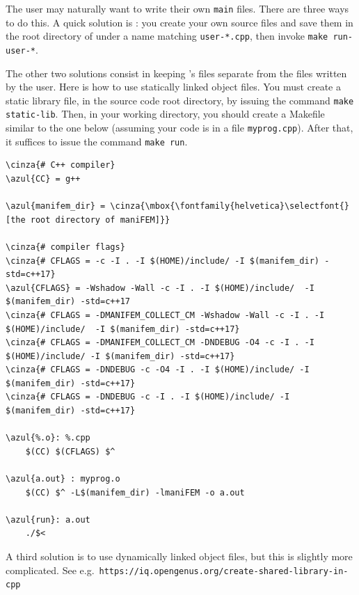 The user may naturally want to write their own {\small\tt main} files.
There are three ways to do this.
A quick solution is : you create your own source files and save them in the root directory
of {\maniFEM} under a name matching {\small\tt user-*.cpp}, then invoke {\small\tt make run-user-*}.

The other two solutions consist in keeping \maniFEM's files separate from the files written
by the user.
Here is how to use statically linked object files.
You must create a static library file, in the {\maniFEM} source code root directory,
by issuing the command {\small\tt make static-lib}.
Then, in your working directory, you should create a Makefile similar to the one below
(assuming your code is in a file {\small\tt myprog.cpp}).
After that, it suffices to issue the command {\small\tt make run}.

\begin{Verbatim}[commandchars=\\\{\},formatcom=\small\tt,frame=single,
   label=Makefile,rulecolor=\color{coment},
   baselinestretch=0.94,framesep=2mm                                            ]
\cinza{# C++ compiler}
\azul{CC} = g++

\azul{manifem_dir} = \cinza{\mbox{\fontfamily{helvetica}\selectfont{}[the root directory of maniFEM]}}

\cinza{# compiler flags}
\cinza{# CFLAGS = -c -I . -I $(HOME)/include/ -I $(manifem_dir) -std=c++17}
\azul{CFLAGS} = -Wshadow -Wall -c -I . -I $(HOME)/include/  -I $(manifem_dir) -std=c++17
\cinza{# CFLAGS = -DMANIFEM_COLLECT_CM -Wshadow -Wall -c -I . -I $(HOME)/include/  -I $(manifem_dir) -std=c++17}
\cinza{# CFLAGS = -DMANIFEM_COLLECT_CM -DNDEBUG -O4 -c -I . -I $(HOME)/include/ -I $(manifem_dir) -std=c++17}
\cinza{# CFLAGS = -DNDEBUG -c -O4 -I . -I $(HOME)/include/ -I $(manifem_dir) -std=c++17}
\cinza{# CFLAGS = -DNDEBUG -c -I . -I $(HOME)/include/ -I $(manifem_dir) -std=c++17}

\azul{%.o}: %.cpp
	$(CC) $(CFLAGS) $^

\azul{a.out} : myprog.o
	$(CC) $^ -L$(manifem_dir) -lmaniFEM -o a.out

\azul{run}: a.out
	./$<
\end{Verbatim}

A third solution is to use dynamically linked object files, but this is slightly more complicated.
See e.g.\ {\small\tt https://iq.opengenus.org/create-shared-library-in-cpp}


